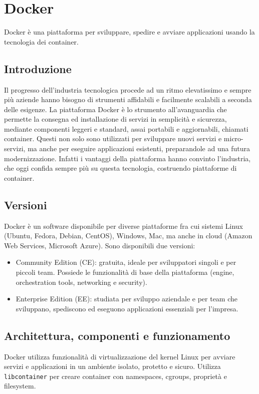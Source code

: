 \chapter{Docker}
\label{Docker}
\thispagestyle{empty}

Docker è una piattaforma per sviluppare, spedire e avviare applicazioni usando la tecnologia dei container.

\section{Introduzione}
Il progresso dell'industria tecnologica procede ad un ritmo elevatissimo e sempre più aziende hanno bisogno di strumenti affidabili e facilmente scalabili a seconda delle esigenze. La piattaforma Docker è lo strumento all'avanguardia che permette la consegna ed installazione di servizi in semplicità e sicurezza, mediante componenti leggeri e standard, assai portabili e aggiornabili, chiamati container. Questi non solo sono utilizzati per sviluppare nuovi servizi e micro-servizi, ma anche per eseguire applicazioni esistenti, preparandole ad una futura modernizzazione. Infatti i vantaggi della piattaforma hanno convinto l'industria, che oggi confida sempre più su questa tecnologia, costruendo piattaforme di container.

\section{Versioni}
Docker è un software disponibile per diverse piattaforme fra cui sistemi Linux (Ubuntu, Fedora, Debian, CentOS), Windows, Mac, ma anche in cloud (Amazon Web Services, Microsoft Azure). Sono disponibili due versioni:
\begin{itemize}
    \item Community Edition (CE): gratuita, ideale per sviluppatori singoli e per piccoli team. Possiede le funzionalità di base della piattaforma (engine, orchestration tools, networking e security).
    \item Enterprise Edition (EE): studiata per sviluppo aziendale e per team che sviluppano, spediscono ed eseguono applicazioni essenziali per l'impresa.
\end{itemize}

\section{Architettura, componenti e funzionamento}
Docker utilizza funzionalità di virtualizzazione del kernel Linux per avviare servizi e applicazioni in un ambiente isolato, protetto e sicuro. Utilizza \verb|libcontainer| per creare container con namespaces, cgroups, proprietà e filesystem.

